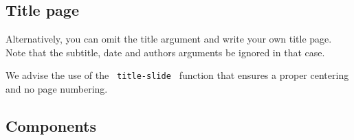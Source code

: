 \begin{Shaded}
\begin{Highlighting}[]






\end{Highlighting}
\end{Shaded}

\subsection{Title page}\label{title-page}

Alternatively, you can omit the title argument and write your own title
page. Note that the subtitle, date and authors arguments be ignored in
that case.

\begin{Shaded}
\begin{Highlighting}[]
\NormalTok{)}

\NormalTok{\#align(center + horizon)[}
\NormalTok{]}

\end{Highlighting}
\end{Shaded}

We advise the use of the \texttt{\ title-slide\ } function that ensures
a proper centering and no page numbering.

\begin{Shaded}
\begin{Highlighting}[]

\NormalTok{\#title{-}slide(layout: "medium")[}
\NormalTok{]}

\end{Highlighting}
\end{Shaded}

\subsection{Components}\label{components}

